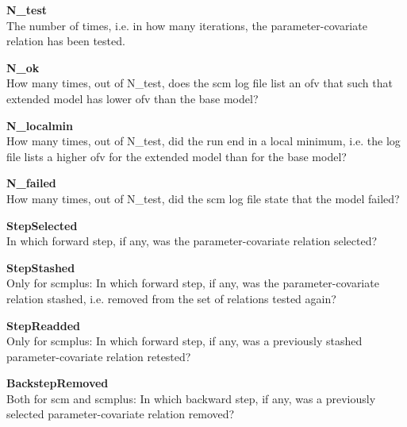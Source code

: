{\bfseries N\_test}\\
The number of times, i.e. in how many iterations, 
the parameter-covariate relation has been tested.

{\bfseries N\_ok}\\
How many times, out of N\_test, does the scm log file list an ofv that such that extended model
has lower ofv than the base model?

{\bfseries N\_localmin}\\
How many times, out of N\_test, did the run end in a local minimum, i.e. the log file lists a
higher ofv for the extended model than for the base model?

{\bfseries N\_failed}\\
How many times, out of N\_test, did the scm log file state that the model failed?

{\bfseries StepSelected} \\
In which forward step, if any, was the parameter-covariate relation selected?

{\bfseries StepStashed} \\
Only for scmplus: In which forward step, if any, was the parameter-covariate relation stashed, i.e. removed from the set of relations tested again?

{\bfseries StepReadded} \\
Only for scmplus: In which forward step, if any, was a previously stashed
parameter-covariate relation retested?

{\bfseries BackstepRemoved}\\ 
Both for scm and scmplus: 
In which backward step, if any, was a previously selected parameter-covariate relation removed?
